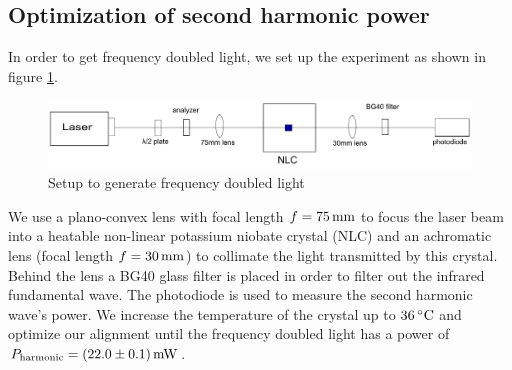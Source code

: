 \documentclass{protokoll_en}
\begin{document}
\subsection{Optimization of second harmonic power}\label{subsec:ana_2nd_harmonic}
In order to get frequency doubled light, we set up the experiment as shown in figure \ref{fig:setup_2ndharmonic}.
\begin{figure}[H]
  \centering
  \includegraphics[width=1.0\textwidth]{graphics/setup_2ndharmonic}
  \caption{Setup to generate frequency doubled light}
  \label{fig:setup_2ndharmonic}
\end{figure}
We use a plano-convex lens with focal length $f = \unit[75]{mm}$ to focus the laser beam into a heatable non-linear potassium niobate crystal (NLC) and an achromatic lens (focal length $f=\unit[30]{mm}$) to collimate the light transmitted by this crystal. Behind the lens a BG40 glass filter is placed in order to filter out the infrared fundamental wave. The photodiode is used to measure the second harmonic wave's power. We increase the temperature of the crystal up to $\unit[36]{^\circ C}$ and optimize our alignment until the frequency doubled light has a power of $P_\textrm{harmonic} = \unit[(22.0 \pm 0.1)]{mW}$.
\end{document}
